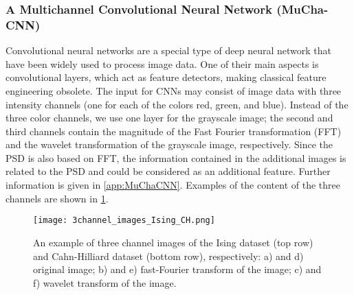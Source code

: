 \documentclass[11pt, authoryear]{elsarticle}
\begin{document}
	
	
	
	
	
	
	\subsubsection{A Multichannel Convolutional Neural Network (MuCha-CNN)}
	\label{sec:MuCha-CNNmodes}
	Convolutional neural networks \citep{lecun2015deep} are a special type of deep 
        neural network that have been widely used to process image data. One of
	their main aspects is convolutional layers, which act as feature detectors,
	making classical feature engineering obsolete. The input for CNNs may consist 
	of image data with three intensity channels (one for each of the colors red, 
	green, and blue). 
	Instead of the three color channels, we use one layer for the grayscale image; 
	the second and third channels contain the magnitude of the Fast Fourier 
	transformation (FFT) and the wavelet transformation of the grayscale image, 
	respectively. Since the \gls{PSD} is also based on FFT, the information 
	contained in the additional images is related to the \gls{PSD} and could be
	considered as an additional feature. Further information is given in 
	\ref{app:MuChaCNN}. Examples of the content of the three channels are shown 
	in \cref{fig:3channel_images_Ising_CH}. 
	\begin{figure}
		\centering
		\texttt{[image: 3channel\_images\_Ising\_CH.png]}
		\caption[]{%
			An example of three channel images of the Ising dataset (top row) 
			and Cahn-Hilliard dataset (bottom row), respectively: a) and d) original 
			image; b) and e) fast-Fourier transform of the image; c) and f) wavelet 
			transform of the image.
		}	
		\label{fig:3channel_images_Ising_CH}
	\end{figure}
	
\end{document}

